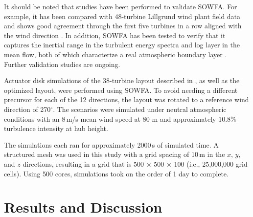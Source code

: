 \documentclass[conf]{new-aiaa}
\begin{document}
It should be noted that studies have been performed to validate SOWFA.  For example, it has been compared with 48-turbine Lillgrund wind plant field data and shows good agreement through the first five turbines in a row aligned with the wind direction \cite{churchfield2012large}.  In addition, SOWFA has been tested to verify that it captures the inertial range in the turbulent energy spectra and log layer in the mean flow, both of which characterize a real atmospheric boundary layer \cite{churchfield2012numerical}.  Further validation studies are ongoing.  

Actuator disk simulations of the 38-turbine layout described in , as well as the  optimized layout, were performed using SOWFA. To avoid needing a different precursor for each of the 12 directions, the layout was rotated to a reference wind direction of 270$^\circ$.  The scenarios were simulated under neutral atmospheric conditions with an 8\,m/s mean wind speed at 80 m and approximately 10.8$\%$ turbulence intensity at hub height.

The simulations each ran for approximately 2000\,s of simulated time.  A structured mesh was used in this study with a grid spacing of 10\,m in the $x$, $y$, and $z$ directions, resulting in a grid that is 500 $\times$ 500 $\times$ 100 (i.e., 25,000,000 grid cells).  Using 500 cores, simulations took on the order of 1 day to complete.  




\section{Results and Discussion}
\end{document}

